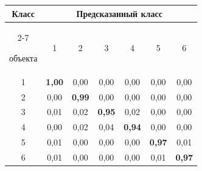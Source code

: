 \begin{table}
\hfill




\begin{minipage}[t]{80mm}


\begin{center}




\vspace*{2ex}








\tabcolsep=6.5pt


\begin{tabular}{|c|c|c|c|c|c|c|}


\hline


Класс & \multicolumn{6}{c|}{Предсказанный класс} \\ 


  \cline{2-7}


объекта & 1 & 2 & 3 & 4 & 5 & 6\\ 


  \hline


 1 & \textbf{1,00} & 0,00 & 0,00 & 0,00 & 0,00 & 0,00\\ 


 2 & 0,00 & \textbf{0,99} & 0,00 & 0,00 & 0,00 & 0,00\\ 


 3 & 0,01 & 0,02 & \textbf{0,95} & 0,02 & 0,00 & 0,00\\ 


 4 & 0,00 & 0,02 & 0,04 & \textbf{0,94} & 0,00 & 0,00\\ 


 5 & 0,01 & 0,00 & 0,00 & 0,00 & \textbf{0,97} & 0,01\\ 


 6 & 0,01 & 0,00 & 0,00 & 0,00 & 0,01 & \textbf{0,97}\\ 


\hline


\end{tabular}


\end{center}


\end{minipage}


\end{table}





